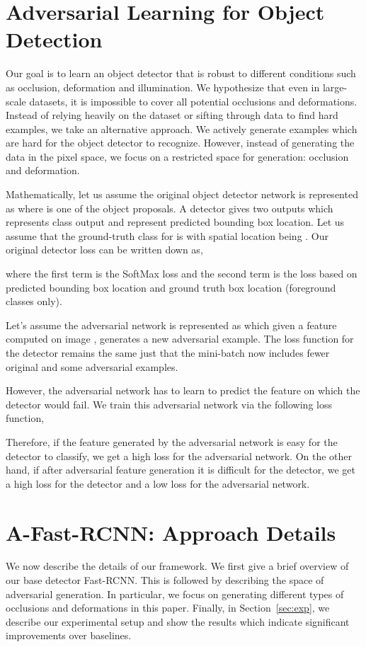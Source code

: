 \documentclass[10pt,twocolumn,letterpaper]{article}
\begin{document}
\section{Adversarial Learning for Object Detection}
Our goal is to learn an object detector that is robust to different conditions such as occlusion, deformation and illumination. We hypothesize that even in large-scale datasets, it is impossible to cover all potential occlusions and deformations. Instead of relying heavily on the dataset or sifting through data to find hard examples, we take an alternative approach. We actively generate examples which are hard for the object detector to recognize. However, instead of generating the data in the pixel space, we focus on a restricted space for generation: occlusion and deformation.

Mathematically, let us assume the original object detector network is represented as  where  is one of the object proposals. A detector gives two outputs  which represents class output and  represent predicted bounding box location. Let us assume that the ground-truth class for  is  with spatial location being . Our original detector loss can be written down as, 
{\small

}
where the first term is the SoftMax loss and the second term is the loss based on predicted bounding box location and ground truth box location (foreground classes only). 

Let's assume the adversarial network is represented as  which given a feature  computed on image , generates a new adversarial example. The loss function for the detector remains the same just that the mini-batch now includes fewer original and some adversarial examples. 

However, the adversarial network has to learn to predict the feature on which the detector would fail. We train this adversarial network via the following loss function,
{\small

}
Therefore, if the feature generated by the adversarial network is easy for the detector to classify, we get a high loss for the adversarial network. On the other hand, if after adversarial feature generation it is difficult for the detector, we get a high loss for the detector and a low loss for the adversarial network.





 
\section{A-Fast-RCNN: Approach Details}
We now describe the details of our framework. We first give a brief overview of our base detector Fast-RCNN. This is followed by describing the space of adversarial generation. In particular, we focus on generating different types of occlusions and deformations in this paper. Finally, in Section~\ref{sec:exp}, we describe our experimental setup and show the results which indicate significant improvements over baselines.
\end{document}
